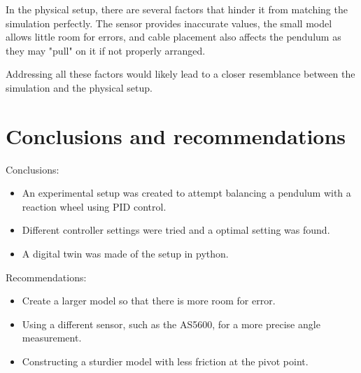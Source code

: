 \documentclass{article}
\begin{document}
\begin{multicols}{2}
\vspace{.5cm}

In the physical setup, there are several factors that hinder it from matching the simulation perfectly. The sensor provides inaccurate values, the small model allows little room for errors, and cable placement also affects the pendulum as they may "pull" on it if not properly arranged.

\vspace{.5cm}

Addressing all these factors would likely lead to a closer resemblance between the simulation and the physical setup.

\section{Conclusions and recommendations}
Conclusions:
\begin{itemize}
\item An experimental setup was created to attempt balancing a pendulum with a reaction wheel using PID control.
\item Different controller settings were tried and a optimal setting was found. 
\item A digital twin was made of the setup in python.  
\end{itemize}
Recommendations:
\begin{itemize}
\item Create a larger model so that there is more room for error.
\item Using a different sensor, such as the AS5600, for a more precise angle measurement. 
\item Constructing a sturdier model with less friction at the pivot point.
\end{itemize}



\end{multicols}
\end{document}
